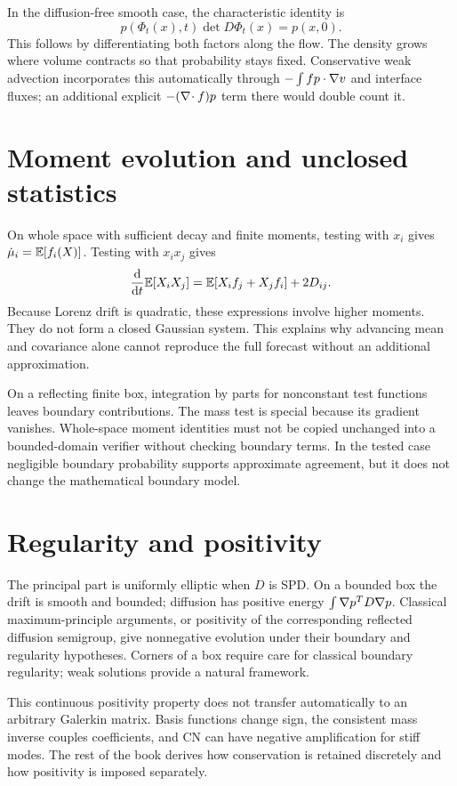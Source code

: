 In the diffusion-free smooth case, the characteristic identity is
\begin{equation}
p(\Phi_t(x),t)\det D\Phi_t(x)=p(x,0).
\end{equation}
This follows by differentiating both factors along the flow. The density grows where volume contracts so that probability stays fixed. Conservative weak advection incorporates this automatically through $-\int fp\cdot\nabla v$ and interface fluxes; an additional explicit $-(\nabla\!\cdot f)p$ term there would double count it.

\section{Moment evolution and unclosed statistics}
On whole space with sufficient decay and finite moments, testing with $x_i$ gives $\dot\mu_i=\mathbb E[f_i(X)]$. Testing with $x_ix_j$ gives
\begin{equation}
\frac{\mathrm d}{\mathrm dt}\mathbb E[X_iX_j]=\mathbb E[X_if_j+X_jf_i]+2D_{ij}.
\end{equation}
Because Lorenz drift is quadratic, these expressions involve higher moments. They do not form a closed Gaussian system. This explains why advancing mean and covariance alone cannot reproduce the full forecast without an additional approximation.

On a reflecting finite box, integration by parts for nonconstant test functions leaves boundary contributions. The mass test is special because its gradient vanishes. Whole-space moment identities must not be copied unchanged into a bounded-domain verifier without checking boundary terms. In the tested case negligible boundary probability supports approximate agreement, but it does not change the mathematical boundary model.

\section{Regularity and positivity}
The principal part is uniformly elliptic when $D$ is SPD. On a bounded box the drift is smooth and bounded; diffusion has positive energy $\int\nabla p^TD\nabla p$. Classical maximum-principle arguments, or positivity of the corresponding reflected diffusion semigroup, give nonnegative evolution under their boundary and regularity hypotheses. Corners of a box require care for classical boundary regularity; weak solutions provide a natural framework.

This continuous positivity property does not transfer automatically to an arbitrary Galerkin matrix. Basis functions change sign, the consistent mass inverse couples coefficients, and CN can have negative amplification for stiff modes. The rest of the book derives how conservation is retained discretely and how positivity is imposed separately.

